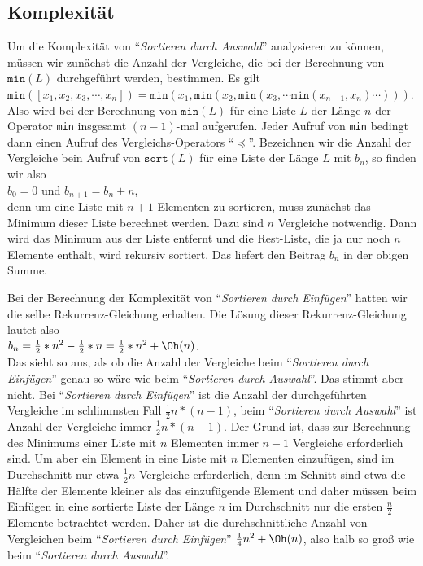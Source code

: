 \subsection{Komplexit\"at}
Um die Komplexit\"at von ``\emph{Sortieren durch Auswahl}'' analysieren zu k\"onnen, m\"ussen
wir zun\"achst die Anzahl der Vergleiche, die bei der Berechnung von $\mathtt{min}(L)$
durchgef\"uhrt werden, bestimmen.  Es gilt \\[0.1cm]
\hspace*{1.3cm} 
$\mathtt{min}([x_1,x_2,x_3,\cdots,x_n]) = \mathtt{min}(x_1, \mathtt{min}(x_2, \mathtt{min}(x_3, \cdots \mathtt{min}(x_{n-1},x_n) \cdots )))$. 
\\[0.1cm]
Also wird bei der Berechnung von $\texttt{min}(L)$ f\"ur eine Liste $L$ der L\"ange $n$ der Operator
\texttt{min} insgesamt $(n-1)$-mal aufgerufen.  Jeder Aufruf von \texttt{min} bedingt dann
einen Aufruf des Vergleichs-Operators ``$\preceq$''.
Bezeichnen wir die Anzahl der Vergleiche bein Aufruf von $\texttt{sort}(L)$ f\"ur eine
Liste der L\"ange $L$ mit $b_n$, so finden wir also \\[0.1cm]
\hspace*{1.3cm} $b_0 = 0$ \quad und \quad $b_{n+1} = b_n + n$, \hspace*{\fill}\\[0.1cm]
denn um eine Liste mit $n+1$ Elementen zu sortieren, muss zun\"achst das Minimum dieser
Liste berechnet werden.  Dazu sind $n$ Vergleiche notwendig.  Dann wird das Minimum aus
der Liste entfernt und die Rest-Liste, die ja nur noch $n$ Elemente enth\"alt, wird rekursiv
sortiert.  Das liefert den Beitrag $b_n$ in der obigen Summe.

Bei der Berechnung der Komplexit\"at von ``\emph{Sortieren durch Einf\"ugen}'' hatten wir die
selbe Rekurrenz-Gleichung erhalten.  Die L\"osung dieser Rekurrenz-Gleichung lautet also \\[0.1cm]
\hspace*{1.3cm} $b_n = \frac{1}{2} * n^2 - \frac{1}{2}* n = \frac{1}{2} * n^2 + \Oh(n)$. \\[0.1cm]
Das sieht so aus, als ob die Anzahl der Vergleiche beim ``\emph{Sortieren durch
  Einf\"ugen}'' genau so w\"are wie beim ``\emph{Sortieren durch Auswahl}''.  Das stimmt aber
nicht.  Bei ``\emph{Sortieren durch Einf\"ugen}'' ist die Anzahl der durchgef\"uhrten
Vergleiche im schlimmsten Fall $\frac{1}{2}n*(n-1)$, beim ``\emph{Sortieren durch
  Auswahl}'' ist Anzahl der Vergleiche \underline{immer} $\frac{1}{2}n*(n-1)$.  Der Grund
ist, dass zur Berechnung des Minimums einer Liste mit $n$ Elementen immer $n-1$ Vergleiche
erforderlich sind.  Um aber ein Element in eine Liste mit $n$ Elementen einzuf\"ugen, sind
im \underline{Durchschnitt} nur etwa $\frac{1}{2}n$ Vergleiche erforderlich, denn im Schnitt sind etwa
die H\"alfte der Elemente kleiner als das einzuf\"ugende Element und daher m\"ussen beim Einf\"ugen
in eine sortierte Liste der L\"ange $n$ im Durchschnitt nur die ersten $\frac{n}{2}$
Elemente betrachtet werden.  Daher ist die durchschnittliche Anzahl von Vergleichen beim
``\emph{Sortieren durch Einf\"ugen}'' $\frac{1}{4}n^2 + \Oh(n)$, also halb so gro{\ss} wie beim
``\emph{Sortieren durch Auswahl}''.



